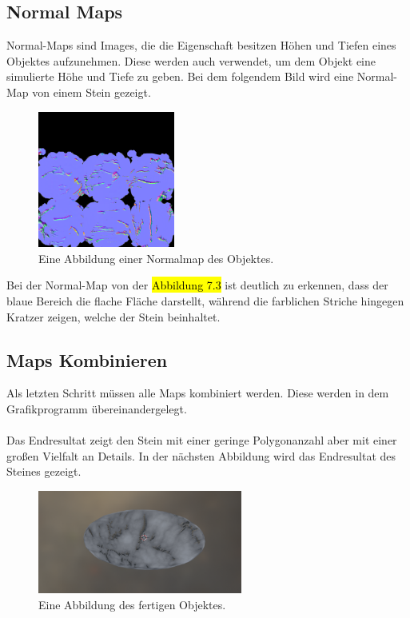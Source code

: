 \subsection{Normal Maps}

Normal-Maps sind Images, die die Eigenschaft besitzen Höhen und Tiefen eines Objektes aufzunehmen. Diese werden auch verwendet, um dem Objekt eine simulierte Höhe und Tiefe zu geben. Bei dem folgendem Bild wird eine Normal-Map von einem Stein gezeigt.

\begin{figure}[H]
    \centering
    \includegraphics[width=0.4\textwidth]{chapters/11/Images/SteinNormal.png}
    \caption{Eine Abbildung einer Normalmap des Objektes.}
    \label{htl01}
\end{figure}
\noindent Bei der Normal-Map von der \hl{Abbildung 7.3} ist deutlich zu erkennen, dass der blaue Bereich die flache Fläche darstellt, während die farblichen Striche hingegen Kratzer zeigen, welche der Stein beinhaltet.

\subsection{Maps Kombinieren}

Als letzten Schritt müssen alle Maps kombiniert werden. Diese werden in dem Grafikprogramm übereinandergelegt.\\\\
Das Endresultat zeigt den Stein mit einer geringe Polygonanzahl aber mit einer großen Vielfalt an Details. In der nächsten Abbildung wird das Endresultat des Steines gezeigt.

\begin{figure}[H]
    \centering
    \includegraphics[width=0.6\textwidth]{chapters/11/Images/SteinCombi.png}
    \caption{Eine Abbildung des fertigen Objektes.}
    \label{htl01}
\end{figure}

